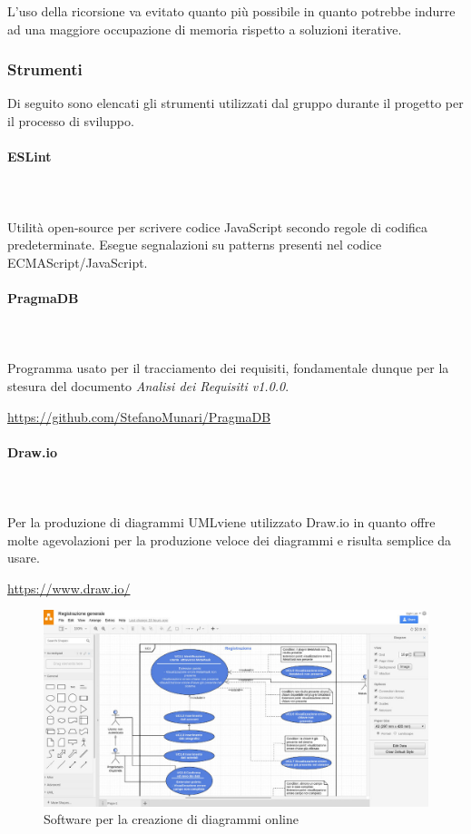 L'uso della ricorsione va evitato quanto più possibile in  quanto potrebbe
indurre ad una maggiore occupazione di memoria rispetto a soluzioni iterative.
	
\subsubsection{Strumenti}
Di seguito sono elencati gli strumenti utilizzati dal gruppo durante il 
progetto per il processo di sviluppo.
		
\paragraph{ESLint} \mbox{}\\ \mbox{}\\
Utilità open-source per scrivere codice JavaScript secondo regole di codifica 
predeterminate. Esegue segnalazioni su patterns presenti nel codice 
ECMAScript/JavaScript.
		
\paragraph{PragmaDB} \mbox{}\\ \mbox{}\\
Programma usato per il tracciamento dei requisiti, fondamentale dunque per la 
stesura del documento \textit{Analisi dei Requisiti v1.0.0}. \newline
\centerline{\url{https://github.com/StefanoMunari/PragmaDB}}
		
\paragraph{Draw.io} \mbox{}\\ \mbox{}\\
Per la produzione di diagrammi UML\glosp viene utilizzato Draw.io in quanto 
offre molte agevolazioni per la produzione veloce dei diagrammi e risulta 
semplice da usare. \newline
\centerline{\url{https://www.draw.io/}}
	\begin{figure}[H]
		\includegraphics[width=0.99\linewidth]{res/images/drawio.jpg}
		\caption{Software per la creazione di diagrammi online}
	\end{figure} 
		
